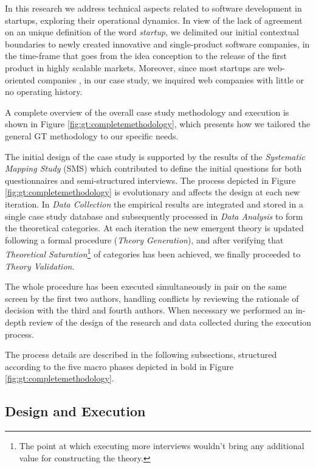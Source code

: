 \documentclass[10pt,journal,letterpaper,compsoc]{IEEEtran}
\begin{document}
In this research we address technical aspects related to software development
in startups, exploring their operational dynamics. In view of the lack of
agreement on an unique definition of the word \textit{startup}, we delimited our
initial contextual boundaries to newly created innovative and single-product
software companies, in the time-frame that goes from the idea conception to the
release of the first product in highly scalable markets. Moreover, since most
startups are web-oriented companies \cite{tc-webstartups-link, Allen2003}, in
our case study, we inquired web companies with little or no operating history.

A complete overview of the overall case study methodology and execution is
shown in Figure \ref{fig:gt:completemethodology}, which presents how we tailored
the general GT methodology to our specific needs.


The initial design of the case study is supported by the results of the
\textit{Systematic Mapping Study} (SMS) \cite{SMS} which contributed to define
the initial questions for both questionnaires and semi-structured interviews.
The process depicted in Figure \ref{fig:gt:completemethodology} is evolutionary
and affects the design at each new iteration. In \textit{Data Collection} the
empirical results are integrated and stored in a single case study database and
subsequently processed in \textit{Data Analysis} to form the theoretical
categories.  At each iteration the new emergent theory is updated following a
formal procedure (\textit{Theory Generation}), and after verifying that
\textit{Theoretical Saturation}\footnote{The point at which executing more
interviews wouldn't bring any additional value for constructing the theory.} of
categories has been achieved, we finally proceeded to \textit{Theory
Validation}.

The whole procedure has been executed simultaneously in pair on the same screen
by the first two authors, handling conflicts by reviewing the rationale of
decision with the third and fourth authors. When necessary we performed an  in-
depth review of the design of the research and data collected during the
execution process.

The process details are described in the following subsections, structured
according to the five macro phases depicted in bold in Figure
\ref{fig:gt:completemethodology}.



\subsection{Design and Execution} \label{desex}
\end{document}
